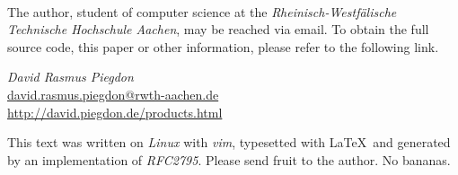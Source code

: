 \documentclass[twoside,a4paper,graphics,11pt,dvips]{article}
\begin{document}
\begin{small}

%
\ 


The author, student of computer science at the \emph{Rheinisch-Westf\"alische
Technische Hochschule Aachen}, may be reached via email. To obtain the full
source code, this paper or other information, please refer to the following
link.

\begin{center}

	\textit{David Rasmus Piegdon} \\
	\href{mailto:david.rasmus.piegdon@rwth-aachen.de}{david.rasmus.piegdon@rwth-aachen.de} \\
	\href{http://david.piegdon.de/products.html}{http://david.piegdon.de/products.html} \\

\end{center}


This text was written on \emph{Linux} with \emph{vim}, typesetted with \LaTeX\
and generated by an implementation of \emph{RFC2795}. Please send fruit to the
author. No bananas.

\end{small}



\pagestyle{headings}

\tableofcontents


%












\newpage
\begingroup

\listoffigures



\endgroup

\end{document}
